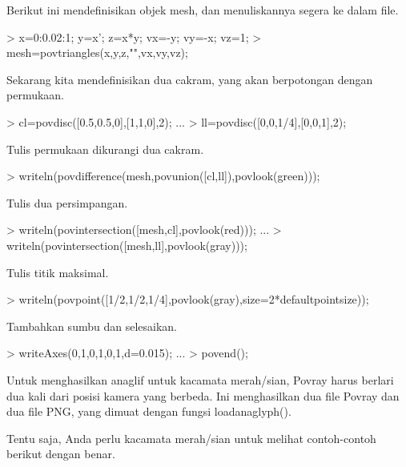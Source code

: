 \documentclass{report}
\begin{document}
\begin{eulernotebook}
\begin{eulercomment}
\begin{eulercomment}
\begin{eulercomment}
Berikut ini mendefinisikan objek mesh, dan menuliskannya segera ke
dalam file.
\end{eulercomment}
\begin{eulerprompt}
> x=0:0.02:1; y=x'; z=x*y; vx=-y; vy=-x; vz=1;
> mesh=povtriangles(x,y,z,"",vx,vy,vz);
\end{eulerprompt}
\begin{eulercomment}
Sekarang kita mendefinisikan dua cakram, yang akan berpotongan dengan
permukaan.
\end{eulercomment}
\begin{eulerprompt}
> cl=povdisc([0.5,0.5,0],[1,1,0],2); ...
> ll=povdisc([0,0,1/4],[0,0,1],2);
\end{eulerprompt}
\begin{eulercomment}
Tulis permukaan dikurangi dua cakram.
\end{eulercomment}
\begin{eulerprompt}
> writeln(povdifference(mesh,povunion([cl,ll]),povlook(green)));
\end{eulerprompt}
\begin{eulercomment}
Tulis dua persimpangan.
\end{eulercomment}
\begin{eulerprompt}
> writeln(povintersection([mesh,cl],povlook(red))); ...
> writeln(povintersection([mesh,ll],povlook(gray)));
\end{eulerprompt}
\begin{eulercomment}
Tulis titik maksimal.
\end{eulercomment}
\begin{eulerprompt}
> writeln(povpoint([1/2,1/2,1/4],povlook(gray),size=2*defaultpointsize));
\end{eulerprompt}
\begin{eulercomment}
Tambahkan sumbu dan selesaikan.
\end{eulercomment}
\begin{eulerprompt}
> writeAxes(0,1,0,1,0,1,d=0.015); ...
> povend();
\end{eulerprompt}
\begin{eulercomment}
Untuk menghasilkan anaglif untuk kacamata merah/sian, Povray harus
berlari dua kali dari posisi kamera yang berbeda. Ini menghasilkan dua
file Povray dan dua file PNG, yang dimuat dengan fungsi
loadanaglyph().

Tentu saja, Anda perlu kacamata merah/sian untuk melihat contoh-contoh
berikut dengan benar.


\end{eulercomment}
\end{eulercomment}
\end{eulercomment}
\end{eulernotebook}
\end{document}
